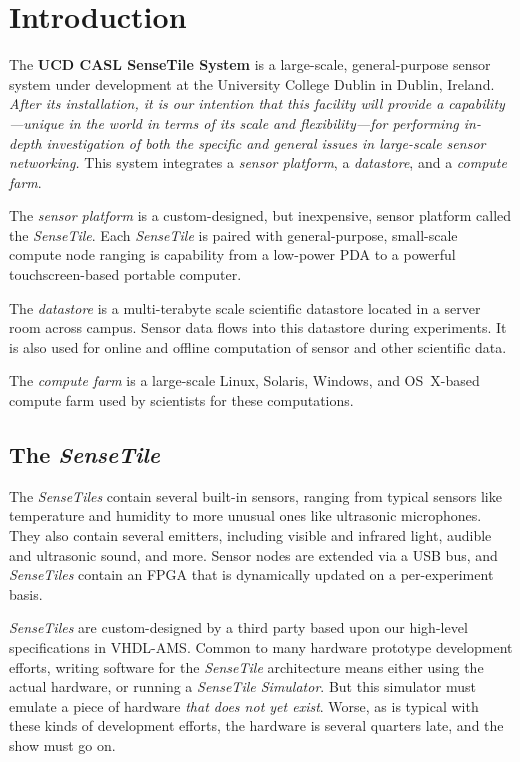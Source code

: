 \documentclass{article}
\newcommand{\ST}{\emph{SenseTile}\xspace}
\newcommand{\STs}{\emph{SenseTiles}\xspace}
\newcommand{\STS}{\emph{SenseTile Simulator}\xspace}
\begin{document}
\section{Introduction}
\label{sec:introduction}

The \textbf{UCD CASL SenseTile System} is a large-scale,
general-purpose sensor system under development at the University
College Dublin in Dublin, Ireland.  \emph{After its installation, it
  is our intention that this facility will provide a
  capability---unique in the world in terms of its scale and
  flexibility---for performing in-depth investigation of both the
  specific and general issues in large-scale sensor networking.}  This
system integrates a \emph{sensor platform}, a \emph{datastore}, and a
\emph{compute farm}.

The \emph{sensor platform} is a custom-designed, but inexpensive,
sensor platform called the \ST.  Each \ST is paired with
general-purpose, small-scale compute node ranging is capability from a
low-power PDA to a powerful touchscreen-based portable computer.  

The \emph{datastore} is a multi-terabyte scale scientific datastore
located in a server room across campus.  Sensor data flows into this
datastore during experiments.  It is also used for online and offline
computation of sensor and other scientific data.

The \emph{compute farm} is a large-scale Linux, Solaris, Windows, and
OS~X-based compute farm used by scientists for these computations.

\subsection{The \ST}
\label{subsec:st}

The \STs contain several built-in sensors, ranging from typical
sensors like temperature and humidity to more unusual ones like
ultrasonic microphones.  They also contain several emitters, including
visible and infrared light, audible and ultrasonic sound, and more.
Sensor nodes are extended via a USB bus, and \STs contain an FPGA that
is dynamically updated on a per-experiment basis.

\STs are custom-designed by a third party based upon our high-level
specifications in VHDL-AMS.  Common to many hardware prototype
development efforts, writing software for the \ST architecture means
either using the actual hardware, or running a \STS.  But this
simulator must emulate a piece of hardware \emph{that does not yet
  exist}.  Worse, as is typical with these kinds of development
efforts, the hardware is several quarters late, and the show must go
on.
\end{document}
